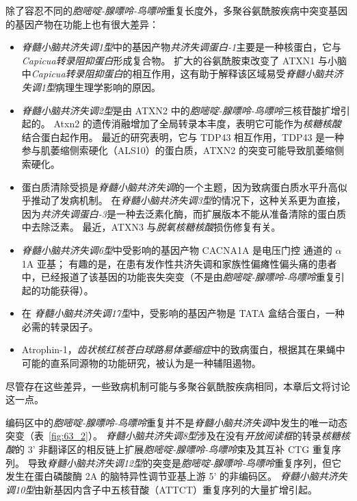 除了容忍不同的\textit{胞嘧啶-腺嘌呤-鸟嘌呤}重复长度外，多聚谷氨酰胺疾病中突变基因的基因产物在功能上也有很大差异：

\begin{itemize}
	\item  \textit{脊髓小脑共济失调1型}中的基因产物\textit{共济失调蛋白-1}主要是一种核蛋白，它与\textit{Capicua转录阻抑蛋白}形成复合物。
	扩大的谷氨酰胺束改变了 ATXN1 与小脑中\textit{Capicua转录阻抑蛋白}的相互作用，这有助于解释该区域易受\textit{脊髓小脑共济失调1型}病理生理学影响的原因。
	
	
	\item \textit{脊髓小脑共济失调2型}是由 ATXN2 中的\textit{胞嘧啶-腺嘌呤-鸟嘌呤}三核苷酸扩增引起的。
	Atxn2 的遗传消融增加了全局转录本丰度，表明它可能作为\textit{核糖核酸}结合蛋白起作用。
	最近的研究表明，它与 TDP43 相互作用，TDP43 是一种参与肌萎缩侧索硬化（ALS10）的蛋白质，ATXN2 的突变可能导致肌萎缩侧索硬化。
	
	
	\item 蛋白质清除受损是\textit{脊髓小脑共济失调}的一个主题，因为致病蛋白质水平升高似乎推动了发病机制。
	在\textit{脊髓小脑共济失调3型}的情况下，这种关系更为直接，因为\textit{共济失调蛋白-3}是一种去泛素化酶，而扩展版本不能从准备清除的蛋白质中去除泛素。
	最近，ATXN3 与\textit{脱氧核糖核酸}损伤修复有关。
	
	
	\item \textit{脊髓小脑共济失调6型}中受影响的基因产物 CACNA1A 是电压门控  通道的 $\alpha$1A 亚基；
	有趣的是，在患有发作性共济失调和家族性偏瘫性偏头痛的患者中，已经报道了该基因的功能丧失突变（不是由\textit{胞嘧啶-腺嘌呤-鸟嘌呤}重复引起的功能获得）。
	
	
	\item 在 \textit{脊髓小脑共济失调17型}中，受影响的基因产物是 TATA 盒结合蛋白，一种必需的转录因子。
	
	
	\item Atrophin-1，\textit{齿状核红核苍白球路易体萎缩症}中的致病蛋白，根据其在果蝇中可能的直系同源物的功能研究，被认为是一种辅阻遏物。

\end{itemize}


尽管存在这些差异，一些致病机制可能与多聚谷氨酰胺疾病相同，本章后文将讨论这一点。


编码区中的\textit{胞嘧啶-腺嘌呤-鸟嘌呤}重复并不是\textit{脊髓小脑共济失调}中发生的唯一动态突变（表~\ref{fig:63_2}）。
\textit{脊髓小脑共济失调8型}涉及在没有\textit{开放阅读框}的转录\textit{核糖核酸}的 3' 非翻译区的相反链上扩展\textit{胞嘧啶-腺嘌呤-鸟嘌呤}束及其互补 CTG 重复序列。
导致\textit{脊髓小脑共济失调12型}的突变是\textit{胞嘧啶-腺嘌呤-鸟嘌呤}重复序列，但它发生在蛋白磷酸酶 2A 的脑特异性调节亚基上游 5' 的非编码区。
\textit{脊髓小脑共济失调10型}由新基因内含子中五核苷酸（ATTCT）重复序列的大量扩增引起。



